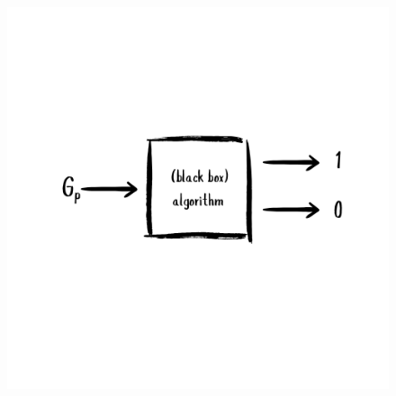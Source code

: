 \documentclass[10pt,aspectratio=43]{beamer}
\begin{document}
\begin{frame}
\begin{columns}
    \begin{column}{0.4\textwidth}
      \begin{figure}
        \centering
        \includegraphics[width=\linewidth]{figures/lec/optmi.png}
      \end{figure}
    \end{column}
  \end{columns}
\end{frame}
\end{document}
